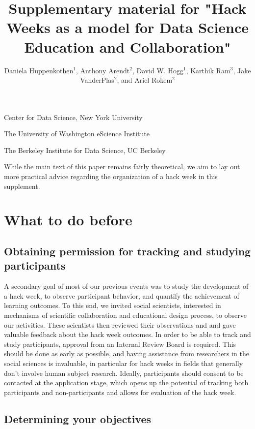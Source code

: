\documentclass{nature}
\title{Supplementary material for "Hack Weeks as a model for Data Science Education and Collaboration"}
\author{Daniela Huppenkothen$^1$, Anthony Arendt$^2$, David W. Hogg$^1$, Karthik Ram$^3$, Jake VanderPlas$^2$, and Ariel Rokem$^2$}
\begin{document}
\maketitle

\begin{affiliations}
 \item Center for Data Science, New York University
 \item The University of Washington eScience Institute
 \item The Berkeley Institute for Data Science, UC Berkeley
\end{affiliations}

\noindent While the main text of this paper remains fairly theoretical, we aim to lay out more practical advice regarding the organization of a hack week in this supplement.

\section{What to do before}

\subsection{Obtaining permission for tracking and studying participants}
A secondary goal of most of our previous events was to study the development of a hack week, to observe participant behavior, and quantify the achievement of learning outcomes. To this end, we invited social scientists, interested in mechanisms of scientific collaboration and educational design process, to observe our activities. These scientists then reviewed their observations and and gave valuable feedback about the hack week outcomes. In order to be able to track and study participants, approval from an Internal Review Board is required. This should be done as early as possible, and having assistance from researchers in the social sciences is invaluable, in particular for hack weeks in fields that generally don't involve human subject research. Ideally, participants should consent to be contacted at the application stage, which opens up the potential of tracking both participants and non-participants and allows for evaluation of the hack week.

\subsection{Determining your objectives}
\end{document}
